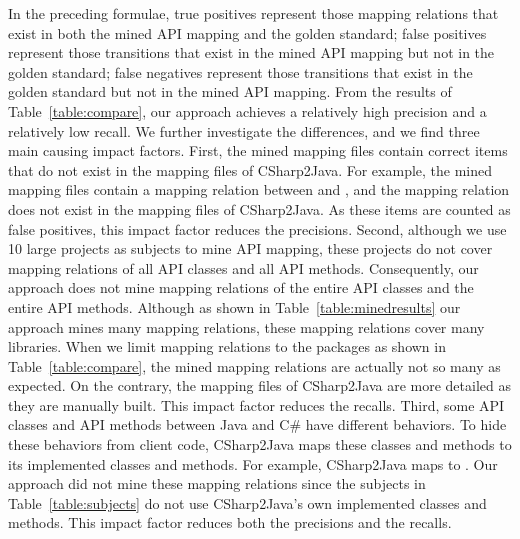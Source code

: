 In the preceding formulae, true positives represent those mapping
relations that exist in both the mined API mapping and the golden
standard; false positives represent those transitions that exist in
the mined API mapping but not in the golden standard; false
negatives represent those transitions that exist in the golden
standard but not in the mined API mapping. From the results of
Table~\ref{table:compare}, our approach achieves a relatively high
precision and a relatively low recall. We further investigate the
differences, and we find three main causing impact factors. First,
the mined mapping files contain correct items that do not exist in
the mapping files of CSharp2Java. For example, the mined mapping
files contain a mapping relation between 
and , and the mapping relation does
not exist in the mapping files of CSharp2Java. As these items are
counted as false positives, this impact factor reduces the
precisions. Second, although we use 10 large projects as subjects to
mine API mapping, these projects do not cover mapping relations of
all API classes and all API methods. Consequently, our approach does
not mine mapping relations of the entire API classes and the entire
API methods. Although as shown in Table~\ref{table:minedresults} our
approach mines many mapping relations, these mapping relations cover
many libraries. When we limit mapping relations to the packages as
shown in Table~\ref{table:compare}, the mined mapping relations are
actually not so many as expected. On the contrary, the mapping files
of CSharp2Java are more detailed as they are manually built. This
impact factor reduces the recalls. Third, some API classes and API
methods between Java and C\# have different behaviors. To hide these
behaviors from client code, CSharp2Java maps these classes and
methods to its implemented classes and methods. For example,
CSharp2Java maps  to
. Our approach did not
mine these mapping relations since the subjects in
Table~\ref{table:subjects} do not use CSharp2Java's own implemented
classes and methods. This impact factor reduces both the precisions
and the recalls.

